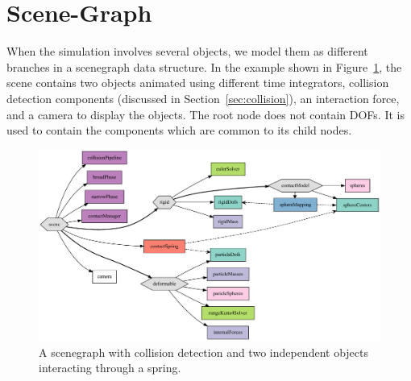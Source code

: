 \section{Scene-Graph}
When the simulation involves several objects, we model them as different branches in a scenegraph data structure.
In the example shown in Figure~\ref{fig:twoObjects}, the scene contains two objects animated using different time integrators, collision detection components (discussed in Section~\ref{sec:collision}), an interaction force, and a camera to display the objects.
The root node does not contain DOFs.
It is used to contain the components which are common to its child nodes.
\begin{figure}
 \begin{center}
\includegraphics[width=0.98\linewidth]{twoObjects.pdf}
 \caption{A scenegraph with collision detection and two independent objects interacting through a spring.}                                                                      
 \label{fig:twoObjects}
\end{center}
\end{figure}

